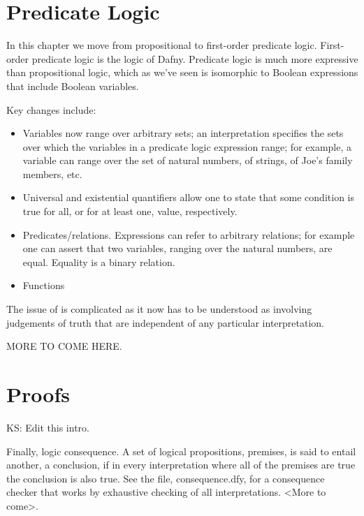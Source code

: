 \documentclass[letterpaper,10pt,english]{sphinxmanual}
\begin{document}
\chapter{Predicate Logic}
\label{\detokenize{14-predicate-logic:predicate-logic}}\label{\detokenize{14-predicate-logic::doc}}
In this chapter we move from propositional to first-order predicate logic.
First-order predicate logic is the logic of Dafny. Predicate logic is much
more expressive than propositional logic, which as we’ve seen is isomorphic
to Boolean expressions that include Boolean variables.

Key changes include:
\begin{itemize}
\item {} 
Variables now range over arbitrary sets; an interpretation specifies the sets over which the variables in a predicate logic expression range; for example, a variable can range over the set of natural numbers, of strings, of Joe’s family members, etc.

\item {} 
Universal and existential quantifiers allow one to state that some condition is true for all, or for at least one, value, respectively.

\item {} 
Predicates/relations. Expressions can refer to arbitrary relations; for example one can assert that two variables, ranging over the natural numbers, are equal.  Equality is a binary relation.

\item {} 
Functions

\end{itemize}

The issue of  is complicated as it now has to be understood
as involving judgements of truth that are independent of any
particular interpretation.

MORE TO COME HERE.


\chapter{Proofs}
\label{\detokenize{15-proofs:proofs}}\label{\detokenize{15-proofs::doc}}
KS: Edit this intro.

Finally, logic consequence. A set of logical propositions, premises,
is said to entail another, a conclusion, if in every interpretation
where all of the premises are true the conclusion is also true. See
the file, consequence.dfy, for a consequence checker that works by
exhaustive checking of all interpretations. \textless{}More to come\textgreater{}.
\end{document}
